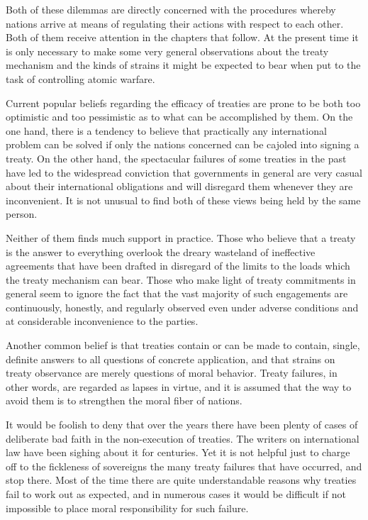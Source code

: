 \begin{introduction}
Both of these dilemmas are directly concerned with the procedures whereby nations arrive at means of regulating their actions with respect to each other. Both of them receive attention in the chapters that follow. At the present time it is only necessary to make some very general observations about the treaty mechanism and the kinds of strains it might be expected to bear when put to the task of controlling atomic warfare.

Current popular beliefs regarding the efficacy of treaties are prone to be both too optimistic and too pessimistic as to what can be accomplished by them. On the one hand, there is a tendency to believe that practically any international problem can be solved if only the nations concerned can be cajoled into signing a treaty. On the other hand, the spectacular failures of some treaties in the past have led to the widespread conviction that governments in general are very casual about their international obligations and will disregard them whenever they are inconvenient. It is not unusual to find both of these views being held by the same person.

Neither of them finds much support in practice. Those who believe that a treaty is the answer to everything overlook the dreary wasteland of ineffective agreements that have been drafted in disregard of the limits to the loads which the treaty mechanism can bear. Those who make light of treaty commitments in general seem to ignore the fact that the vast majority of such engagements are continuously, honestly, and regularly observed even under adverse conditions and at considerable inconvenience to the parties.

Another common belief is that treaties contain or can be made to contain, single, definite answers to all questions of concrete application, and that strains on treaty observance are merely questions of moral behavior. Treaty failures, in other words, are regarded as lapses in virtue, and it is assumed that the way to avoid them is to strengthen the moral fiber of nations.

It would be foolish to deny that over the years there have been plenty of cases of deliberate bad faith in the non-execution of treaties. The writers on international law have been sighing about it for centuries. Yet it is not helpful just to charge off to the fickleness of sovereigns the many treaty failures that have occurred, and stop there. Most of the time there are quite understandable reasons why treaties fail to work out as expected, and in numerous cases it would be difficult if not impossible to place moral responsibility for such failure.


\end{introduction}
